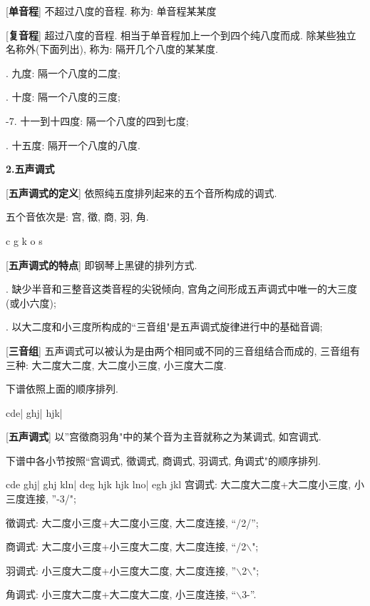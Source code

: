 [\textbf{单音程}] 不超过八度的音程. 称为: 单音程某某度\par

[\textbf{复音程}] 超过八度的音程. 相当于单音程加上一个到四个纯八度而成. 除某些独立名称外(下面列出), 称为: 隔开几个八度的某某度.\par
{}. 九度: 隔一个八度的二度;\par
{}. 十度: 隔一个八度的三度;\par
{}-7. 十一到十四度: 隔一个八度的四到七度;\par
{}. 十五度: 隔开一个八度的八度.\par

\clearpage

\begin{center}
 \textbf{2.五声调式}\\
\end{center}

[\textbf{五声调式的定义}] 依照纯五度排列起来的五个音所构成的调式.\par
\qquad 五个音依次是: 宫, 徵, 商, 羽, 角.\par
\startextract
\Notes \wh c \wh g \wh k \wh o \wh s \en
\zendextract

[\textbf{五声调式的特点}] 即钢琴上黑键的排列方式.\par
{}. 缺少半音和三整音这类音程的尖锐倾向, 宫角之间形成五声调式中唯一的大三度(或小六度);\par
{}. 以大二度和小三度所构成的``三音组"是五声调式旋律进行中的基础音调;\par

[\textbf{三音组}] 五声调式可以被认为是由两个相同或不同的三音组结合而成的, 三音组有三种: 大二度大二度, 大二度小三度, 小三度大二度.\par
\qquad 下谱依照上面的顺序排列. \par
\startextract
\Notes \wh c\wh d\wh e\en\bar
\Notes \wh g\wh h\wh j\en\bar
\Notes \wh h\wh j\wh k\en\bar
\zendextract

[\textbf{五声调式}] 以''宫徵商羽角"中的某个音为主音就称之为某调式, 如宫调式.\par
\qquad 下谱中各小节按照``宫调式, 徵调式, 商调式, 羽调式, 角调式"的顺序排列.\par
\startextract
\Notes \wh c\wh d\wh e \en
\Notes \wh g\wh h\wh j\en\bar
\Notes \wh g\wh h\wh j\en
\Notes \wh k\wh l\wh n\en\bar
\Notes \wh d\wh e\wh g\en
\Notes \wh h\wh j\wh k\en
\zendextract
\startextract
{}
\Notes \wh h\wh j\wh k\en
\Notes \wh l\wh n\wh o\en\bar
\Notes \wh e\wh g\wh h\en
\Notes \wh j\wh k\wh l\en
\zendextract
\qquad 宫调式: 大二度大二度+大二度小三度, 小三度连接, ''-3/";\par
\qquad 徵调式: 大二度小三度+大二度小三度, 大二度连接, ``/2/'';\par
\qquad 商调式: 大二度小三度+小三度大二度, 大二度连接, ``/2$\backslash$";\par
\qquad 羽调式: 小三度大二度+小三度大二度, 大二度连接, ''$\backslash$2$\backslash$";\par
\qquad 角调式: 小三度大二度+大二度大二度, 小三度连接, ``$\backslash$3-''.\par

